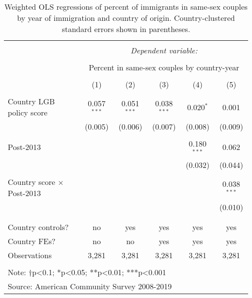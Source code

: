 \documentclass[
  11pt,
]{article}
\begin{document}
\begin{table}[!htbp] \centering 
  \caption{Weighted OLS regressions of percent of immigrants in same-sex couples by year of immigration and country of origin. Country-clustered standard errors shown in parentheses.} 
  \label{tab:country-props} 
\begin{tabular}{@{\extracolsep{5pt}}lccccc} 
\\[-1.8ex]\hline 
\hline \\[-1.8ex] 
 & \multicolumn{5}{c}{\textit{Dependent variable:}} \\ 
\cline{2-6} 
\\[-1.8ex] & \multicolumn{5}{c}{Percent in same-sex couples by country-year} \\ 
\\[-1.8ex] & (1) & (2) & (3) & (4) & (5)\\ 
\hline \\[-1.8ex] 
 Country LGB policy score & 0.057$^{***}$ & 0.051$^{***}$ & 0.038$^{***}$ & 0.020$^{*}$ & 0.001 \\ 
  & (0.005) & (0.006) & (0.007) & (0.008) & (0.009) \\ 
  & & & & & \\ 
 Post-2013 &  &  &  & 0.180$^{***}$ & 0.062 \\ 
  &  &  &  & (0.032) & (0.044) \\ 
  & & & & & \\ 
 Country score × Post-2013 &  &  &  &  & 0.038$^{***}$ \\ 
  &  &  &  &  & (0.010) \\ 
  & & & & & \\ 
\hline \\[-1.8ex] 
Country controls? & no & yes & yes & yes & yes \\ 
Country FEs? & no & no & yes & yes & yes \\ 
Observations & 3,281 & 3,281 & 3,281 & 3,281 & 3,281 \\ 
\hline 
\hline \\[-1.8ex] 
\multicolumn{6}{l}{Note: †p<0.1; *p<0.05; **p<0.01; ***p<0.001} \\ 
\multicolumn{6}{l}{Source: American Community Survey 2008-2019} \\ 
\end{tabular} 
\end{table}
\end{document}
